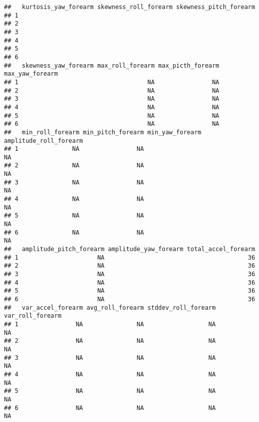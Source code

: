 \documentclass[]{article}
\begin{document}
\begin{verbatim}
##   kurtosis_yaw_forearm skewness_roll_forearm skewness_pitch_forearm
## 1                                                                  
## 2                                                                  
## 3                                                                  
## 4                                                                  
## 5                                                                  
## 6                                                                  
##   skewness_yaw_forearm max_roll_forearm max_picth_forearm max_yaw_forearm
## 1                                    NA                NA                
## 2                                    NA                NA                
## 3                                    NA                NA                
## 4                                    NA                NA                
## 5                                    NA                NA                
## 6                                    NA                NA                
##   min_roll_forearm min_pitch_forearm min_yaw_forearm amplitude_roll_forearm
## 1               NA                NA                                     NA
## 2               NA                NA                                     NA
## 3               NA                NA                                     NA
## 4               NA                NA                                     NA
## 5               NA                NA                                     NA
## 6               NA                NA                                     NA
##   amplitude_pitch_forearm amplitude_yaw_forearm total_accel_forearm
## 1                      NA                                        36
## 2                      NA                                        36
## 3                      NA                                        36
## 4                      NA                                        36
## 5                      NA                                        36
## 6                      NA                                        36
##   var_accel_forearm avg_roll_forearm stddev_roll_forearm var_roll_forearm
## 1                NA               NA                  NA               NA
## 2                NA               NA                  NA               NA
## 3                NA               NA                  NA               NA
## 4                NA               NA                  NA               NA
## 5                NA               NA                  NA               NA
## 6                NA               NA                  NA               NA

\end{verbatim}
\end{document}
